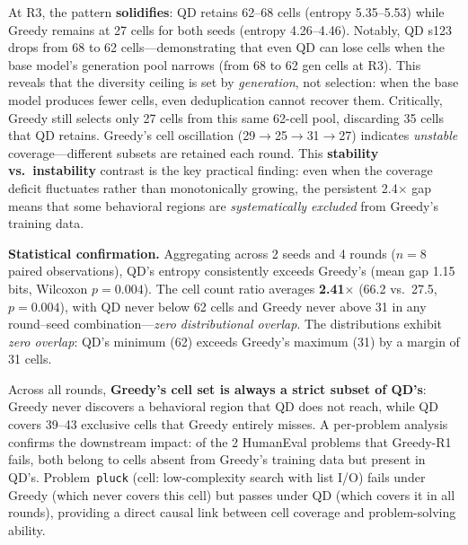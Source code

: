 \documentclass{article}
\begin{document}
\begin{enumerate}[nosep]
At R3, the pattern \textbf{solidifies}: QD retains 62--68 cells (entropy 5.35--5.53) while Greedy remains at 27 cells for both seeds (entropy 4.26--4.46).
Notably, QD s123 drops from 68 to 62 cells---demonstrating that even QD can lose cells when the base model's generation pool narrows (from 68 to 62 gen cells at R3).
This reveals that the diversity ceiling is set by \emph{generation}, not selection: when the base model produces fewer cells, even deduplication cannot recover them.
Critically, Greedy still selects only 27 cells from this same 62-cell pool, discarding 35 cells that QD retains.
Greedy's cell oscillation (29$\to$25$\to$31$\to$27) indicates \emph{unstable} coverage---different subsets are retained each round.
This \textbf{stability vs.\ instability} contrast is the key practical finding: even when the coverage deficit fluctuates rather than monotonically growing, the persistent 2.4$\times$ gap means that some behavioral regions are \emph{systematically excluded} from Greedy's training data.

\textbf{Statistical confirmation.}
Aggregating across 2 seeds and 4 rounds ($n{=}8$ paired observations), QD's entropy consistently exceeds Greedy's (mean gap 1.15 bits, Wilcoxon $p{=}0.004$).
The cell count ratio averages \textbf{2.41$\times$} (66.2 vs.\ 27.5, $p{=}0.004$), with QD never below 62 cells and Greedy never above 31 in any round--seed combination---\emph{zero distributional overlap}.
The distributions exhibit \emph{zero overlap}: QD's minimum (62) exceeds Greedy's maximum (31) by a margin of 31 cells.

Across all rounds, \textbf{Greedy's cell set is always a strict subset of QD's}: Greedy never discovers a behavioral region that QD does not reach, while QD covers 39--43 exclusive cells that Greedy entirely misses.
A per-problem analysis confirms the downstream impact: of the 2 HumanEval problems that Greedy-R1 fails, both belong to cells absent from Greedy's training data but present in QD's.
Problem~\texttt{pluck} (cell: low-complexity search with list I/O) fails under Greedy (which never covers this cell) but passes under QD (which covers it in all rounds), providing a direct causal link between cell coverage and problem-solving ability.


\end{enumerate}
\end{document}
